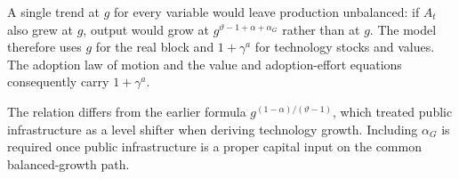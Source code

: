 \documentclass[11pt]{article}
\begin{document}
A single trend at $g$ for every variable would leave production unbalanced: if
$A_t$ also grew at $g$, output would grow at
$g^{\vartheta-1+\alpha+\alpha_G}$ rather than at $g$. The model therefore uses
$g$ for the real block and $1+\gamma^a$ for technology stocks and values. The
adoption law of motion and the value and adoption-effort equations consequently
carry $1+\gamma^a$.

The relation differs from the earlier formula
$g^{(1-\alpha)/(\vartheta-1)}$, which treated public infrastructure as a level
shifter when deriving technology growth. Including $\alpha_G$ is required once
public infrastructure is a proper capital input on the common balanced-growth
path.
\end{document}
